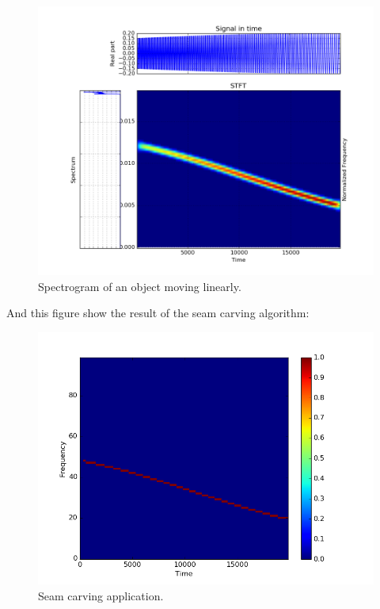 \begin{figure}[H]
\centering
    \includegraphics[scale=0.6,angle=0]{Images/SpectrogramObjMov.png}
    \caption{Spectrogram of an object moving linearly.}
    \label{fig:SpectrogramObjMov}
\end{figure}

And this figure show the result of the seam carving algorithm:

\begin{figure}[H]
\centering
    \includegraphics[scale=0.6,angle=0]{Images/SpectrogramObjMov_LawFound.png}
    \caption{Seam carving application.}
    \label{fig:SpectrogramObjMov_LawFound}
\end{figure}

